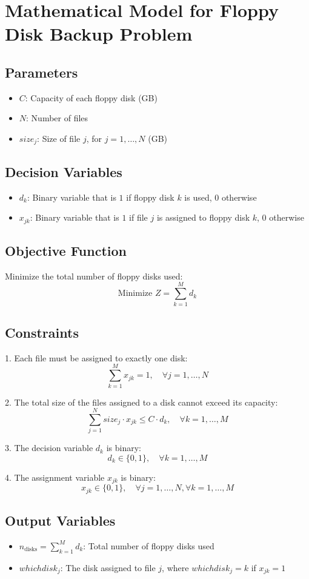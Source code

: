 \documentclass{article}
\begin{document}
\section*{Mathematical Model for Floppy Disk Backup Problem}

\subsection*{Parameters}
\begin{itemize}
    \item $C$: Capacity of each floppy disk (GB)
    \item $N$: Number of files
    \item $size_j$: Size of file $j$, for $j = 1, \ldots, N$ (GB)
\end{itemize}

\subsection*{Decision Variables}
\begin{itemize}
    \item $d_k$: Binary variable that is $1$ if floppy disk $k$ is used, $0$ otherwise
    \item $x_{jk}$: Binary variable that is $1$ if file $j$ is assigned to floppy disk $k$, $0$ otherwise
\end{itemize}

\subsection*{Objective Function}
Minimize the total number of floppy disks used:
\[
\text{Minimize } Z = \sum_{k=1}^{M} d_k
\]

\subsection*{Constraints}
1. Each file must be assigned to exactly one disk:
\[
\sum_{k=1}^{M} x_{jk} = 1, \quad \forall j = 1, \ldots, N
\]

2. The total size of the files assigned to a disk cannot exceed its capacity:
\[
\sum_{j=1}^{N} size_j \cdot x_{jk} \leq C \cdot d_k, \quad \forall k = 1, \ldots, M
\]

3. The decision variable $d_k$ is binary:
\[
d_k \in \{0, 1\}, \quad \forall k = 1, \ldots, M
\]

4. The assignment variable $x_{jk}$ is binary:
\[
x_{jk} \in \{0, 1\}, \quad \forall j = 1, \ldots, N, \forall k = 1, \ldots, M
\]

\subsection*{Output Variables}
\begin{itemize}
    \item $n_{\text{disks}} = \sum_{k=1}^{M} d_k$: Total number of floppy disks used
    \item $whichdisk_j$: The disk assigned to file $j$, where $whichdisk_j = k$ if $x_{jk} = 1$
\end{itemize}
\end{document}
